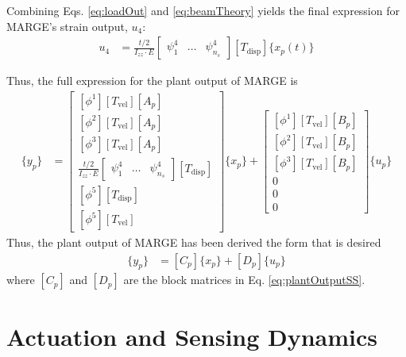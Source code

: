 Combining Eqs. \ref{eq:loadOut} and \ref{eq:beamTheory} yields the final expression for MARGE's strain output, $u_4$:
\begin{align}
	u_4 &= \frac{t/2}{I_{zz} \cdot E} \begin{bmatrix} \psi_1^4 & \dots & \psi_{n_s}^4 \end{bmatrix} [T_\text{disp}] \{x_p(t)\}
\end{align}

Thus, the full expression for the plant output of MARGE is
\begin{align}
	\label{eq:plantOutputSS}
	\{y_p\} &= \begin{bmatrix}
		\left[ \phi^1 \right] [T_\text{vel}] [A_p] \\
		\left[ \phi^2 \right] [T_\text{vel}] [A_p] \\
		\left[ \phi^3 \right] [T_\text{vel}] [A_p] \\
		\frac{t/2}{I_{zz} \cdot E} \begin{bmatrix} \psi_1^4 & \dots & \psi_{n_s}^4 \end{bmatrix} [T_\text{disp}] \\
		\left[ \phi^5 \right] [T_\text{disp}] \\
		\left[ \phi^5 \right] [T_\text{vel}]
	\end{bmatrix} \{x_p\} + \begin{bmatrix}
		\left[ \phi^1 \right] [T_\text{vel}] [B_p] \\
		\left[ \phi^2 \right] [T_\text{vel}] [B_p] \\
		\left[ \phi^3 \right] [T_\text{vel}] [B_p] \\
		0 \\ 0 \\ 0
	\end{bmatrix}  \{u_p\}
\end{align}
Thus, the plant output of MARGE has been derived the form that is desired
\begin{align}
	\{y_p\} &= [C_p] \{x_p\} + [D_p] \{u_p\}
\end{align}
where $[C_p]$ and $[D_p]$ are the block matrices in Eq. \ref{eq:plantOutputSS}.

\section{Actuation and Sensing Dynamics} %

